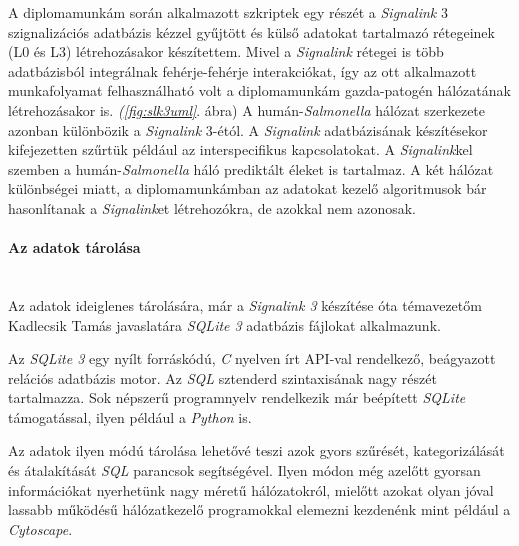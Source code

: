 \documentclass[a4paper,12pt]{article}
\begin{document}
			A diplomamunkám során alkalmazott szkriptek egy részét a \textit{Signalink} 3 szignalizációs adatbázis kézzel gyűjtött és külső adatokat tartalmazó rétegeinek (L0 és L3) létrehozásakor készítettem.  Mivel a \textit{Signalink} rétegei is több adatbázisból integrálnak fehérje-fehérje interakciókat, így az ott alkalmazott munkafolyamat felhasználható volt a diplomamunkám gazda-patogén hálózatának létrehozásakor is. \textit{(\ref{fig:slk3uml}}. ábra) A humán-\textit{Salmonella} hálózat szerkezete azonban különbözik a \textit{Signalink} 3-étól. A \textit{Signalink} adatbázisának készítésekor kifejezetten szűrtük például az interspecifikus kapcsolatokat. A \textit{Signalink}kel szemben a humán-\textit{Salmonella} háló prediktált éleket is tartalmaz. A két hálózat különbségei miatt, a diplomamunkámban az adatokat kezelő algoritmusok bár hasonlítanak a \textit{Signalink}et létrehozókra, de azokkal nem azonosak.
			
			\paragraph{Az adatok tárolása} \mbox{}\\
			Az adatok ideiglenes tárolására, már a \textit{Signalink 3} készítése óta témavezetőm Kadlecsik Tamás javaslatára \textit{SQLite 3} adatbázis fájlokat alkalmazunk. 
			
			
			Az \textit{SQLite 3} egy nyílt forráskódú, \textit{C} nyelven írt API-val rendelkező, beágyazott relációs adatbázis motor. Az \textit{SQL} sztenderd szintaxisának nagy részét tartalmazza. Sok népszerű programnyelv rendelkezik már beépített \textit{SQLite} támogatással, ilyen például a \textit{Python} is. \cite{sqlite3}			
			
				
			Az adatok ilyen módú tárolása lehetővé teszi azok gyors szűrését, kategorizálását és átalakítását \textit{SQL} parancsok segítségével. Ilyen módon még azelőtt gyorsan információkat nyerhetünk nagy méretű hálózatokról, mielőtt azokat olyan jóval lassabb működésű hálózatkezelő programokkal elemezni kezdenénk mint például a \textit{Cytoscape}.
\end{document}
